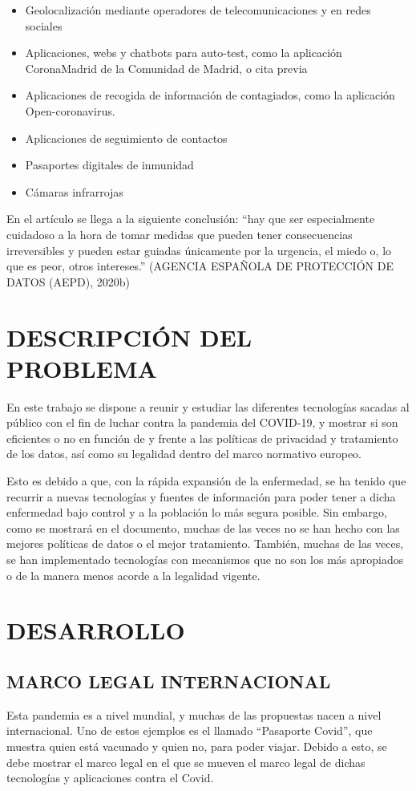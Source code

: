 \documentclass[11pt,a4paper,spanish]{article}
\begin{document}
\begin{itemize}
\item Geolocalización mediante operadores de telecomunicaciones y en redes sociales
\item Aplicaciones, webs y chatbots para auto-test, como la aplicación CoronaMadrid de la Comunidad de Madrid, o cita previa
\item Aplicaciones de recogida de información de contagiados, como la aplicación Open-coronavirus.
\item Aplicaciones de seguimiento de contactos
\item Pasaportes digitales de inmunidad
\item Cámaras infrarrojas 
\end{itemize} 

En el artículo se llega a la siguiente conclusión: “hay que ser especialmente cuidadoso a la hora de tomar medidas que pueden tener consecuencias irreversibles y pueden estar guiadas únicamente por la urgencia, el miedo o, lo que es peor, otros intereses.” (AGENCIA ESPAÑOLA DE PROTECCIÓN DE DATOS (AEPD), 2020b)
\section{DESCRIPCIÓN DEL PROBLEMA}

En este trabajo se dispone a reunir y estudiar las diferentes tecnologías sacadas al público con el fin de luchar contra la pandemia del COVID-19, y mostrar si son eficientes o no en función de y frente a las políticas de privacidad y tratamiento de los datos, así como su legalidad dentro del marco normativo europeo. 

Esto es debido a que, con la rápida expansión de la enfermedad, se ha tenido que recurrir a nuevas tecnologías y fuentes de información para poder tener a dicha enfermedad bajo control y a la población lo más segura posible. Sin embargo, como se mostrará en el documento, muchas de las veces no se han hecho con las mejores políticas de datos o el mejor tratamiento. También, muchas de las veces, se han implementado tecnologías con mecanismos que no son los más apropiados o de la manera menos acorde a la legalidad vigente.

\section{DESARROLLO}
\subsection{MARCO LEGAL INTERNACIONAL}
Esta pandemia es a nivel mundial, y muchas de las propuestas nacen a nivel internacional. Uno de estos ejemplos es el llamado “Pasaporte Covid”, que muestra quien está vacunado y quien no, para poder viajar. Debido a esto, se debe mostrar el marco legal en el que se mueven el marco legal de dichas tecnologías y aplicaciones contra el Covid.
\end{document}
